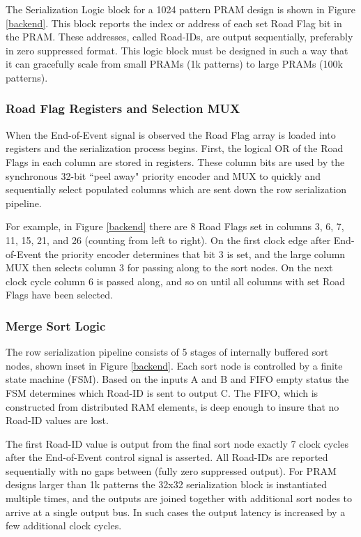 \documentclass[letterpaper]{article}
\begin{document}
The Serialization Logic block for a 1024 pattern PRAM design is shown in Figure \ref{backend}. This block reports the index or address of each set Road Flag bit in the PRAM. These addresses, called Road-IDs, are output sequentially, preferably in zero suppressed format. This logic block must be designed in such a way that it can gracefully scale from small PRAMs (1k patterns) to large PRAMs (100k patterns).

\subsubsection{Road Flag Registers and Selection MUX}

When the End-of-Event signal is observed the Road Flag array is loaded into registers and the serialization process begins. First, the logical OR of the Road Flags in each column are stored in registers. These column bits are used by the synchronous 32-bit ``peel away" priority encoder and MUX to quickly and sequentially select populated columns which are sent down the row serialization pipeline. 

For example, in Figure \ref{backend} there are 8 Road Flags set in columns 3, 6, 7, 11, 15, 21, and 26 (counting from left to right). On the first clock edge after End-of-Event the priority encoder determines that bit 3 is set, and the large column MUX then selects column 3 for passing along to the sort nodes. On the next clock cycle column 6 is passed along, and so on until all columns with set Road Flags have been selected.

\subsubsection{Merge Sort Logic}

The row serialization pipeline consists of 5 stages of internally buffered sort nodes, shown inset in Figure \ref{backend}. Each sort node is controlled by a finite state machine (FSM). Based on the inputs A and B and FIFO empty status the FSM determines which Road-ID is sent to output C. The FIFO, which is constructed from distributed RAM elements, is deep enough to insure that no Road-ID values are lost.

The first Road-ID value is output from the final sort node exactly 7 clock cycles after the End-of-Event control signal is asserted. All Road-IDs are reported sequentially with no gaps between (fully zero suppressed output). For PRAM designs larger than 1k patterns the 32x32 serialization block is instantiated multiple times, and the outputs are joined together with additional sort nodes to arrive at a single output bus. In such cases the output latency is increased by a few additional clock cycles.
\end{document}
